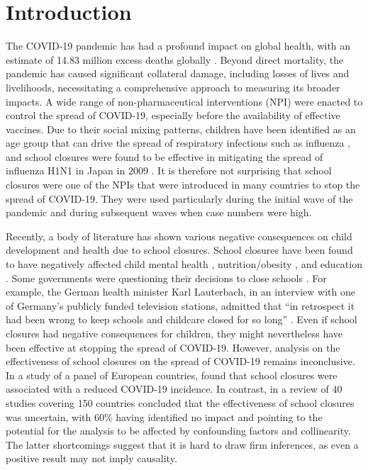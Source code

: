 \documentclass[]{interact}
\theoremstyle{plain}%
\theoremstyle{definition}
\theoremstyle{remark}
\begin{document}
\section{Introduction}\label{introduction}

The COVID-19 pandemic has had a profound impact on global health, with an estimate of 14.83 million excess deaths globally \citep{msemburi2023estimates}. Beyond direct mortality, the pandemic has caused significant collateral damage, including losses of lives and livelihoods, necessitating a comprehensive approach to measuring its broader impacts. A wide range of non-pharmaceutical interventions (NPI) were enacted to control the spread of COVID-19, especially before the availability of effective vaccines. Due to their social mixing patterns, children have been identified as an age group that can drive the spread of respiratory infections such as influenza \citep{moser2018estimating}, and school closures were found to be effective in mitigating the spread of influenza H1N1 in Japan in 2009 \citep{kawano2015substantial}. It is therefore not surprising that school closures were one of the NPIs that were introduced in many countries to stop the spread of COVID-19. They were used particularly during the initial wave of the pandemic and during subsequent waves when case numbers were high.

Recently, a body of literature has shown various negative consequences on child development and health due to school closures. School closures have been found to have negatively affected child mental health \citep{moulin2022longitudinal}, nutrition/obesity \citep{sugimoto2023temporal}, and education \citep{lerkkanen2023reading}. Some governments were questioning their decisions to close schools \citep{de2021determines}. For example, the German health minister Karl Lauterbach, in an interview with one of Germany's publicly funded television stations, admitted that ``in retrospect it had been wrong to keep schools and childcare closed for so long'' \citep{ard2023lauterbach}. Even if school closures had negative consequences for children, they might nevertheless have been effective at stopping the spread of COVID-19. However, analysis on the effectiveness of school closures on the spread of COVID-19 remains inconclusive. In a study of a panel of European countries, \citet{alfano2022effects} found that school closures were associated with a reduced COVID-19 incidence. In contrast, \citet{walsh2021school} in a review of 40 studies covering 150 countries concluded that the effectiveness of school closures was uncertain, with 60\% having identified no impact and pointing to the potential for the analysis to be affected by confounding factors and collinearity. The latter shortcomings suggest that it is hard to draw firm inferences, as even a positive result may not imply causality.
\end{document}
